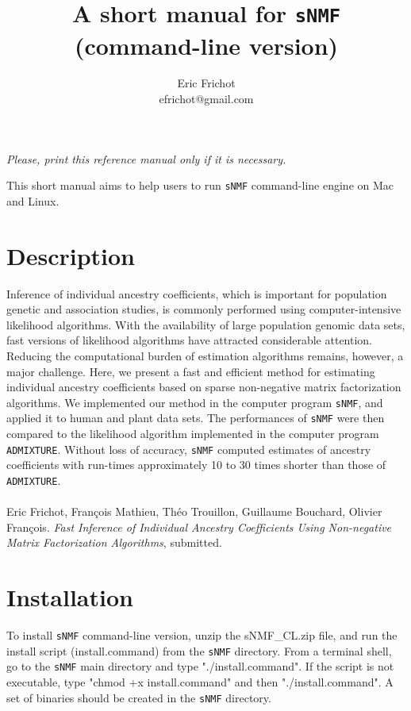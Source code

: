 \documentclass[10pt,a4paper]{article}
\title{\bf \Large A short manual for {\tt sNMF}\\
\large (command-line version)
}
\author{
        Eric Frichot\\efrichot@gmail.com\\
}
\begin{document}
\maketitle
\begin{center}
{\it Please, print this reference manual only if it is necessary.}
\end{center}

\noindent
This short manual aims to help users to run {\tt sNMF} command-line engine on Mac and Linux. 

\section{Description} 
Inference of individual ancestry coefficients, which is important for population genetic and association studies, is commonly performed using computer-intensive likelihood algorithms. With the availability of large population genomic data sets, fast versions of likelihood algorithms have attracted considerable attention. Reducing the computational burden of estimation algorithms remains, however, a major challenge. Here, we present a fast and efficient method for estimating individual ancestry coefficients based on sparse non-negative matrix factorization algorithms. We implemented our method in the computer program {\tt sNMF}, and applied it to human and plant data sets. The performances of {\tt sNMF} were then compared to the likelihood algorithm implemented in the computer program {\tt ADMIXTURE}.  Without loss of accuracy, {\tt sNMF} computed estimates of ancestry coefficients with run-times approximately 10 to 30 times shorter than those of {\tt ADMIXTURE}.
\\
\\
\noindent
\cite{Frichot_2013} Eric Frichot, François Mathieu, Théo Trouillon, Guillaume Bouchard, Olivier François. {\it Fast Inference of Individual Ancestry Coefficients Using Non-negative Matrix Factorization Algorithms}, submitted. 

\section{Installation} 

\noindent
To install {\tt sNMF} command-line version, unzip the sNMF\_CL.zip file, and run the 
install script (install.command) from the {\tt sNMF} directory.
From a terminal shell, go to the {\tt sNMF} main directory and type "./install.command".
If the script is not executable, type "chmod +x install.command" and then "./install.command".
A set of binaries should be created in the {\tt sNMF} directory.
\end{document}
